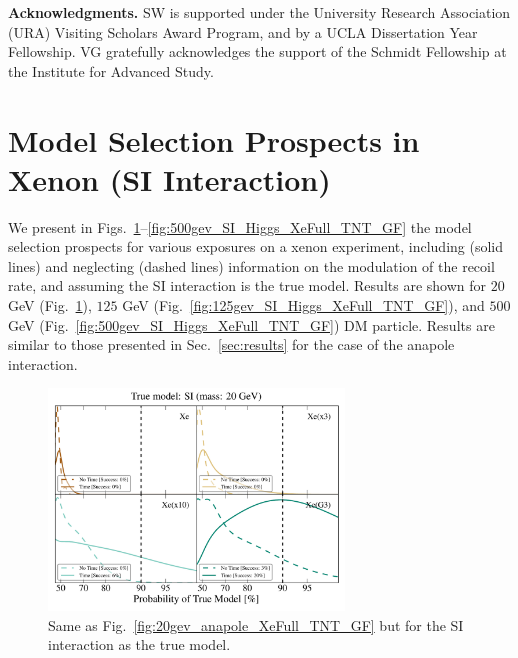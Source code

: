 \documentclass[11pt]{article}
\newcommand{\Sec}[1]{Sec.~\ref{#1}} \newcommand{\Secs}[2]{Secs.~\ref{#1} and \ref{#2}} \newcommand{\Secm}[2]{Secs.~\ref{#1} through \ref{#2}}
\newcommand{\Fig}[1]{Fig.~\ref{#1}} \newcommand{\Figs}[2]{Figs.~\ref{#1} and \ref{#2}}
\begin{document}
\bigskip

\textbf{Acknowledgments.} SW is supported under the University Research Association (URA) Visiting Scholars Award Program, and by a UCLA Dissertation Year Fellowship. VG gratefully acknowledges the support of the Schmidt Fellowship at the Institute for Advanced Study. %

\appendix

\section{Model Selection Prospects in Xenon (SI Interaction)}
We present in Figs.~\ref{fig:20gev_SI_Higgs_XeFull_TNT_GF}--\ref{fig:500gev_SI_Higgs_XeFull_TNT_GF} the model selection prospects for various exposures on a xenon experiment, including (solid lines) and neglecting (dashed lines) information on the modulation of the recoil rate, and assuming the SI interaction is the true model. Results are shown for $20$ GeV (\Fig{fig:20gev_SI_Higgs_XeFull_TNT_GF}), $125$ GeV (\Fig{fig:125gev_SI_Higgs_XeFull_TNT_GF}), and $500$ GeV (\Fig{fig:500gev_SI_Higgs_XeFull_TNT_GF}) DM particle. Results are similar to those presented in \Sec{sec:results} for the case of the anapole interaction. 


\begin{figure}
\centering
\includegraphics[width=0.7\textwidth]{plots/PDF_20GeV_SI_Higgs_50sims_Xe_Xe3x_Xe10x_XeG3_GF_TNT.pdf}
\caption{\label{fig:20gev_SI_Higgs_XeFull_TNT_GF}
Same as Fig.~\ref{fig:20gev_anapole_XeFull_TNT_GF} but for the SI interaction as the true model.}
\end{figure}
\end{document}
